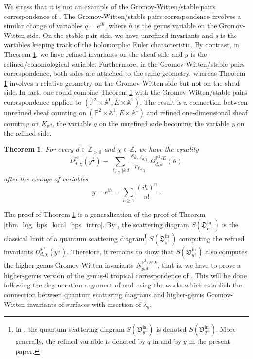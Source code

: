\documentclass[11pt,letterpaper]{amsart}
\newtheorem{thm}[defn]{Theorem}
\newcommand\A{\mathbb A}
\newcommand\PP{\mathbb P}
\newcommand\Z{\mathbb Z}
\newcommand\fD{\mathfrak D}
\newcommand\cl{\operatorname{cl}}
\newcommand\iin{\mathrm{in}}
\begin{document}
We stress that it is not an example of the Gromov-Witten/stable pairs correspondence of 
\cite{MR2264664}. 
The Gromov-Witten/stable pairs correspondence involves a similar change of variables $q=e^{i\hbar}$, where $\hbar$ is the genus variable on the Gromov-Witten side. 
On the stable pair side, we have unrefined invariants and $q$ is the variables keeping track of the holomorphic Euler characteristic. 
By contrast, in Theorem \ref{thm_log_bps_local_bps_refined_intro}, we have refined invariants on the sheaf side and $y$ is the refined/cohomological variable. 
Furthermore, in the Gromov-Witten/stable pairs correspondence, both sides are attached to the same geometry, whereas Theorem \ref{thm_log_bps_local_bps_refined_intro} involves a relative geometry on the Gromov-Witten side but not on the sheaf side.
In fact, one could combine Theorem \ref{thm_log_bps_local_bps_refined_intro} with the Gromov-Witten/stable pairs correspondence applied to $(\PP^2 \times \A^1, E \times \A^1)$. The result is a connection between unrefined sheaf counting on $(\PP^2 \times \A^1, E \times \A^1)$ and refined one-dimensional sheaf counting on $K_{\PP^2}$, the variable $q$ on the unrefined side becoming the variable $y$ on the refined side.

\begin{thm}\label{thm_log_bps_local_bps_refined_intro}
For every $d\in \Z_{>0}$ and $\chi \in \Z$, we have the equality
\[ 
\Omega_{d,\chi}^{\PP^2}(y^{\frac{1}{2}})=\sum_{\ell_{d,\chi}|k|d}
\frac{s_{k,\ell_{d,\chi}}}{r_{\ell_{d,\chi}}} \Omega_{d,k}^{\PP^2/E}(\hbar)\,\]
after the change of variables 
\[y=e^{i\hbar}=\sum_{n\geqslant 1}\frac{(i\hbar)^n}{n!}\,.\]
\end{thm}

The proof of Theorem \ref{thm_log_bps_local_bps_refined_intro} is a generalization of the proof of Theorem \ref{thm_log_bps_local_bps_intro}.
By \cite{bousseau2019scattering}, the scattering diagram $S(\fD^\iin_{\cl^+})$
is the classical limit of a quantum scattering diagram\footnote{In  \cite{bousseau2019scattering}, the quantum scattering diagram $S(\fD^\iin_{y^+})$ is denoted $S(\fD^\iin_{q^+})$. More generally, the refined variable is denoted by $q$ in \cite{bousseau2019scattering} and by $y$ in the present paper.}
$S(\fD^\iin_{y^+})$
computing the refined invariants 
$\Omega_{d,\chi}^{\PP^2}(y^{\frac{1}{2}})$.
Therefore, it remains to show that  $S(\fD^\iin_{y^+})$ also computes the higher-genus
Gromov-Witten invariants $N_{g,d}^{\PP^2/E,k}$, that is, we have to prove a higher-genus version of the genus-$0$ tropical correspondence of \cite{gabele2019tropical}.
This will be done following the degeneration argument of \cite{gabele2019tropical}
and using the works \cite{MR3904449, bousseau2018quantum_tropical} which establish the connection between quantum scattering diagrams and higher-genus Gromov-Witten invariants of surfaces with insertion of $\lambda_g$.
\end{document}
